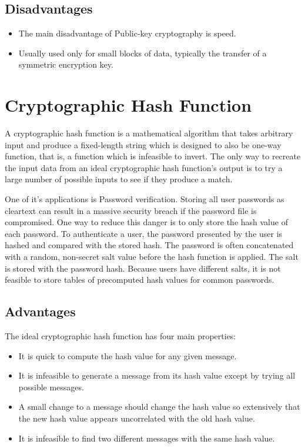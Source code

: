 \subsection{Disadvantages}
\begin{itemize}
	\item The main disadvantage of Public-key cryptography is speed.
	\item Usually used only for small blocks of data, typically the transfer of a symmetric encryption key.
\end{itemize}

\section{Cryptographic Hash Function}
\par A cryptographic hash function is a mathematical algorithm that takes arbitrary input and produce a fixed-length string which is designed to also be one-way function, that is, a function which is infeasible to invert. The only way to recreate the input data from an ideal cryptographic hash function's output is to try a large number of possible inputs to see if they produce a match. \par
One of it's applications is Password verification. Storing all user passwords as cleartext can result in a massive security breach if the password file is compromised. One way to reduce this danger is to only store the hash value of each password. To authenticate a user, the password presented by the user is hashed and compared with the stored hash. The password is often concatenated with a random, non-secret salt value before the hash function is applied. The salt is stored with the password hash. Because users have different salts, it is not feasible to store tables of precomputed hash values for common passwords. 
\subsection{Advantages}
The ideal cryptographic hash function has four main properties:
\begin{itemize}
	\item It is quick to compute the hash value for any given message.
	\item It is infeasible to generate a message from its hash value except by trying all possible messages.
	\item A small change to a message should change the hash value so extensively that the new hash value appears uncorrelated with the old hash value.
	\item It is infeasible to find two different messages with the same hash value.
\end{itemize}
